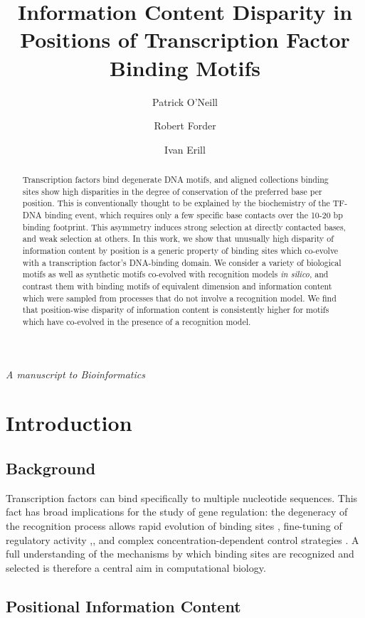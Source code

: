 \documentclass{article}
\title{Information Content Disparity in Positions of Transcription Factor Binding Motifs}
\author[1]{Patrick O'Neill}
\author[2]{Robert Forder}
\author[1]{Ivan Erill}
\affil[1]{Department of Biological Sciences, UMBC}
\affil[2]{Department of Mathematics and Statistics, UMBC}
\begin{document}
\maketitle{}
\begin{center}
  \textit{A manuscript to Bioinformatics}
\end{center}

\begin{abstract}
  Transcription factors bind degenerate DNA motifs, and
  aligned collections binding sites show high disparities in the
  degree of conservation of the preferred base per position.  This is
  conventionally thought to be explained by the biochemistry of the
  TF-DNA binding event, which requires only a few specific base
  contacts over the 10-20 bp binding footprint.  This asymmetry induces
  strong selection at directly contacted bases, and weak selection at
  others.  In this work, we show that unusually high disparity of
  information content by position is a generic property of binding
  sites which co-evolve with a transcription factor's DNA-binding
  domain.  We consider a variety of biological motifs as well as
  synthetic motifs co-evolved with recognition models \textit{in
    silico}, and contrast them with binding motifs of equivalent
  dimension and information content which were sampled from processes
  that do not involve a recognition model.  We find that position-wise
  disparity of information content is consistently higher for motifs
  which have co-evolved in the presence of a recognition model.
\end{abstract}
\doublespacing
\section{Introduction}
\subsection{Background}
Transcription factors can bind specifically to multiple nucleotide
sequences.  This fact has broad implications for the study of gene
regulation: the degeneracy of the recognition process allows rapid
evolution of binding sites \cite{berg04}, fine-tuning of regulatory
activity \cite{babu03},\cite{dekel05}, and complex
concentration-dependent control strategies \cite{hamilton88}.  A full
understanding of the mechanisms by which binding sites are recognized
and selected is therefore a central aim in computational biology.

\subsection{Positional Information Content}
\end{document}
